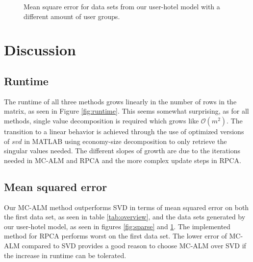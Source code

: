 \documentclass[10pt,conference,compsocconf]{IEEEtran}
\begin{document}
\begin{figure}
\caption{Mean square error for data sets from our user-hotel model with a different amount of user groups.}
\label{fig:usergroups}
\end{figure}


\section{Discussion}

\subsection{Runtime}
The runtime of all three methods grows linearly in the number of rows in the matrix, as seen in Figure \ref{fig:runtime}. This seems somewhat surprising, as for all methods, single value decomposition is required which grows like $\mathcal{O}(m^2)$. The transition to a linear behavior is achieved through the use of optimized versions of $svd$ in MATLAB using economy-size decomposition to only retrieve the singular values needed. The different slopes of growth are due to the iterations needed in MC-ALM and RPCA and the more complex update steps in RPCA.

\subsection{Mean squared error}
Our MC-ALM method outperforms SVD in terms of mean squared error on both the first data set, as seen in table \ref{tab:overview}, and the data sets generated by our user-hotel model, as seen in figures \ref{fig:sparse} and \ref{fig:usergroups}. The implemented method for RPCA performs worst on the first data set. The lower error of MC-ALM compared to SVD provides a good reason to choose MC-ALM over SVD if the increase in runtime can be tolerated. \\
\end{document}
